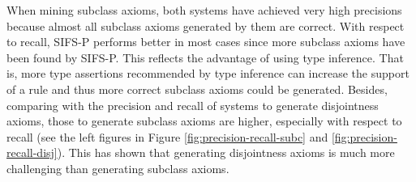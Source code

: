 When mining subclass axioms, both systems have achieved very high precisions because almost all subclass axioms generated by them are correct. With respect to recall, SIFS-P performs better in most cases since more subclass axioms have been found by SIFS-P. This reflects the advantage of using type inference. That is, more type assertions recommended by type inference can increase the support of a rule and thus more correct subclass axioms could be generated. Besides, comparing with the precision and recall of systems to generate disjointness axioms, those to generate subclass axioms are higher, especially with respect to recall (see the left figures in Figure \ref{fig:precision-recall-subc} and  \ref{fig:precision-recall-disj}). This has shown that generating disjointness axioms is much more challenging than generating subclass axioms. 

